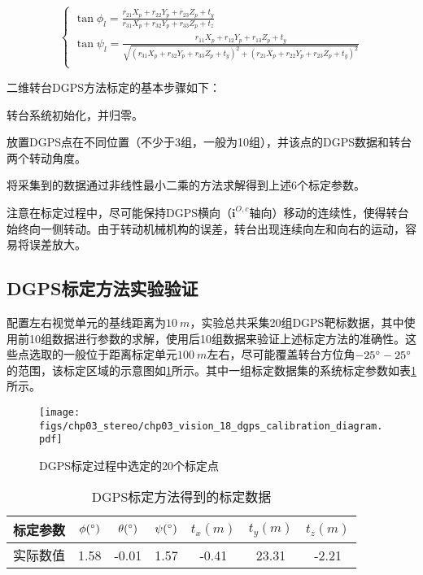 \begin{equation}
\left\{ \begin{gathered}
\tan \phi_l= \frac{r_{21}X_p + r_{22}Y_p + r_{23}Z_p + t_y}{r_{31}X_p + r_{32}Y_p + r_{33}Z_p + t_z} \\
\tan \psi_l= \frac{r_{11}X_p + r_{12}Y_p + r_{13}Z_p + t_y}{\sqrt{(r_{31}X_p + r_{32}Y_p + r_{33}Z_p + t_y)^2+(r_{21}X_p + r_{22}Y_p + r_{23}Z_p + t_y)^2} }\\
\end{gathered}  \right.
\end{equation}

二维转台DGPS方法标定的基本步骤如下：
\begin{compactenum}
	\item
	转台系统初始化，并归零。
	\item
	放置DGPS点在不同位置（不少于3组，一般为10组），并该点的DGPS数据和转台两个转动角度。
	\item
	将采集到的数据通过非线性最小二乘的方法求解得到上述6个标定参数。
\end{compactenum}
注意在标定过程中，尽可能保持DGPS横向（$\mathbf{i}^{O,c}$轴向）移动的连续性，使得转台始终向一侧转动。由于转动机械机构的误差，转台出现连续向左和向右的运动，容易将误差放大。

\subsection{DGPS标定方法实验验证}
配置左右视觉单元的基线距离为$10\ m$，实验总共采集20组DGPS靶标数据，其中使用前10组数据进行参数的求解，使用后10组数据来验证上述标定方法的准确性。这些点选取的一般位于距离标定单元$100\ m$左右，尽可能覆盖转台方位角$-25\degree-25\degree$的范围，该标定区域的示意图如\ref{fig:chp03_vision_18_dgps_calibration_diagram}所示。其中一组标定数据集的系统标定参数如表\ref{label:dgps_calibration}所示。

\begin{figure}[htb]
	\centering
	\texttt{[image: figs/chp03\_stereo/chp03\_vision\_18\_dgps\_calibration\_diagram.pdf]}	
	\caption{DGPS标定过程中选定的20个标定点}
	\label{fig:chp03_vision_18_dgps_calibration_diagram}
\end{figure}

\begin{table}[htb]
	\centering
	\caption{DGPS标定方法得到的标定数据}
	\label{label:dgps_calibration}
	\begin{tabular}{ccccccc}
		\hline
		标定参数 & $\phi (\degree)$ & $\theta (\degree)$ & $\psi (\degree)$ & $t_x (m)$ & $t_y(m)$ & $t_z(m)$ \\ \hline
		实际数值 & 1.58             & -0.01              & 1.57             & -0.41     & 23.31   & -2.21    \\ \hline
	\end{tabular}
\end{table}

